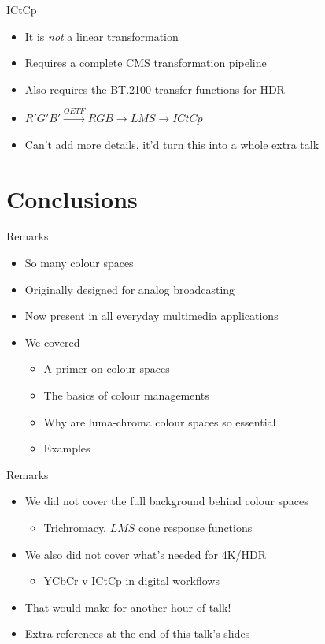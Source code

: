 \documentclass[aspectratio=169,usepdftitle=false]{fireshonks}
\begin{document}
\begin{frame}{ICtCp}
    \begin{itemize}
        \item It is \emph{not} a linear transformation
        \item Requires a complete CMS transformation pipeline
        \item Also requires the BT.2100 transfer functions for HDR
        \item $R'G'B' \xrightarrow{OETF} RGB \to LMS \to ICtCp$
        \item Can't add more details, it'd turn this into a whole extra talk 
    \end{itemize}
\end{frame}
\section{Conclusions}
\begin{frame}{Remarks}
    \begin{itemize}
        \item So many colour spaces
        \item Originally designed for analog broadcasting
        \item Now present in all everyday multimedia applications
        \item We covered
              \begin{itemize}
                  \item A primer on colour spaces
                  \item The basics of colour managements
                  \item Why are luma-chroma colour spaces so essential
                  \item Examples
              \end{itemize}
    \end{itemize}
\end{frame}
\begin{frame}{Remarks}
    \begin{itemize}
        \item We did not cover the full background behind colour spaces
        \begin{itemize}
            \item Trichromacy, $LMS$ cone response functions
        \end{itemize}
        \item We also did not cover what's needed for 4K/HDR
        \begin{itemize}
            \item YCbCr v ICtCp in digital workflows
        \end{itemize}
        \item That would make for another hour of talk!
        \item Extra references at the end of this talk's slides
    \end{itemize}
\end{frame}
\end{document}
